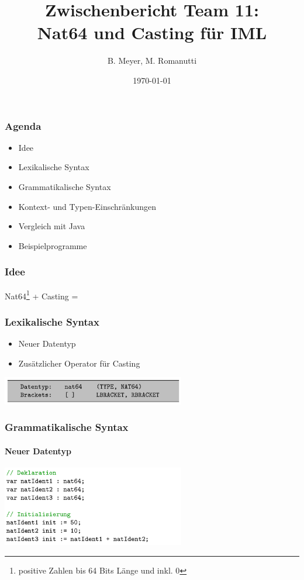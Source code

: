 \documentclass{beamer}
\title[Nat64 und Casting für IML]{Zwischenbericht Team 11: \protect\\ Nat64 und Casting für IML}
\author{B. Meyer, M. Romanutti}
\date{\today}
\institute{FHNW}
\begin{document}
    \begin{frame}[plain]
        \maketitle
    \end{frame}

    \begin{frame}
        \frametitle{Agenda}
        \begin{itemize}
            \item Idee
            \item Lexikalische Syntax
            \item Grammatikalische Syntax
            \item Kontext- und Typen-Einschränkungen
            \item Vergleich mit Java
            \item Beispielprogramme
        \end{itemize}

    \end{frame}

    \begin{frame}
        \frametitle{Idee}
        \centering
        Nat64\footnote{positive Zahlen bis 64 Bits Länge und inkl. 0} + Casting = \faRocket
    \end{frame}

    \begin{frame}
        \frametitle{Lexikalische Syntax}
        \begin{itemize}
            \item Neuer Datentyp
            \item Zusätzlicher Operator für Casting
        \end{itemize}
        \vspace{30}
        {\hspace{15}\includegraphics[width=8cm]{listing_1.png}}

    \end{frame}

    \begin{frame}
        \frametitle{Grammatikalische Syntax}
        \framesubtitle{Neuer Datentyp}
        {\includegraphics[width=8cm]{listing_2.png}}
    \end{frame}
\end{document}

